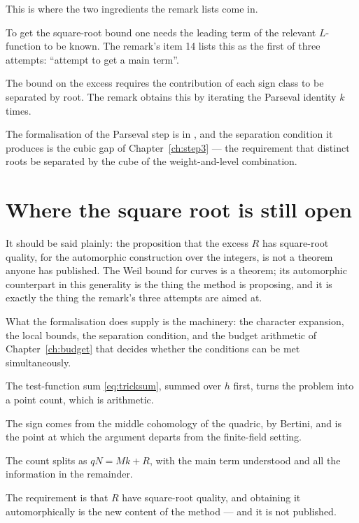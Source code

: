 This is where the two ingredients the remark lists come in.

\begin{description}[style=nextline,leftmargin=0pt,labelwidth=0pt,labelsep=0pt,font=\sffamily\bfseries\small,
  itemsep=6pt]
\item[A main term.] To get the square-root bound one needs the leading term
of the relevant $L$-function to be known. The remark's item 14 lists this as
the first of three attempts: ``attempt to get a main term''.
\item[Parseval, iterated $k$ times.] The bound on the excess requires the
contribution of each sign class to be separated by root. The remark obtains
this by iterating the Parseval identity $k$ times.
\end{description}

The formalisation of the Parseval step is
 in
,
and the separation condition it produces is the cubic gap of
Chapter~\ref{ch:step3} --- the requirement that distinct roots be separated
by the cube of the weight-and-level combination.

\section{Where the square root is still open}It should be said plainly: the proposition that the excess $R$ has
square-root quality, for the automorphic construction over the integers, is
not a theorem anyone has published. The Weil bound for curves is a theorem; its
automorphic counterpart in this generality is the thing the method is
proposing, and it is exactly the thing the remark's three attempts are aimed
at.

What the formalisation does supply is the machinery: the character expansion,
the local bounds, the separation condition, and the budget arithmetic of
Chapter~\ref{ch:budget} that decides whether the conditions can be met
simultaneously.

\begin{keytakeaways}
\item The test-function sum \eqref{eq:tricksum}, summed over $h$ first,
turns the problem into a point count, which is arithmetic.
\item The sign comes from the middle cohomology of the quadric, by Bertini, and
is the point at which the argument departs from the finite-field setting.
\item The count splits as $qN = Mk + R$, with the main term understood and
all the information in the remainder.
\item The requirement is that $R$ have square-root quality, and obtaining it
automorphically is the new content of the method --- and it is not published.
\end{keytakeaways}

